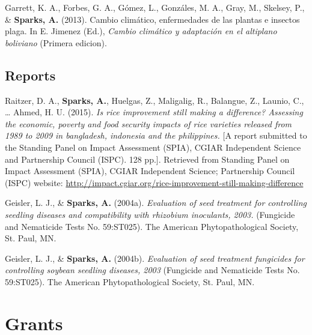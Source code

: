\documentclass[11pt, a4paper]{awesome-cv}
\begin{document}
\leavevmode\hypertarget{ref-Garrett2013}{}%
Garrett, K. A., Forbes, G. A., Gómez, L., Gonzáles, M. A., Gray, M.,
Skelsey, P., \& \textbf{Sparks, A.} (2013). Cambio climático,
enfermedades de las plantas e insectos plaga. In E. Jimenez (Ed.),
\emph{Cambio climático y adaptación en el altiplano boliviano} (Primera
edicion).

\endgroup

\hypertarget{reports}{%
\subsection{Reports}\label{reports}}

\begingroup
\setlength{\parindent}{-0.5in}
\setlength{\leftskip}{0.5in}

\hypertarget{refs_reports}{}
\leavevmode\hypertarget{ref-Raitzer2015}{}%
Raitzer, D. A., \textbf{Sparks, A.}, Huelgas, Z., Maligalig, R.,
Balangue, Z., Launio, C., \ldots{} Ahmed, H. U. (2015). \emph{Is rice
improvement still making a difference? Assessing the economic, poverty
and food security impacts of rice varieties released from 1989 to 2009
in bangladesh, indonesia and the philippines.} {[}A report submitted to
the Standing Panel on Impact Assessment (SPIA), CGIAR Independent
Science and Partnership Council (ISPC). 128 pp.{]}. Retrieved from
Standing Panel on Impact Assessment (SPIA), CGIAR Independent Science;
Partnership Council (ISPC) website:
\url{http://impact.cgiar.org/rice-improvement-still-making-difference}

\leavevmode\hypertarget{ref-Geisler2004}{}%
Geisler, L. J., \& \textbf{Sparks, A.} (2004a). \emph{Evaluation of seed
treatment for controlling seedling diseases and compatibility with
rhizobium inoculants, 2003.} (Fungicide and Nematicide Tests No.
59:ST025). The American Phytopathological Society, St. Paul, MN.

\leavevmode\hypertarget{ref-Geisler2004a}{}%
Geisler, L. J., \& \textbf{Sparks, A.} (2004b). \emph{Evaluation of seed
treatment fungicides for controlling soybean seedling diseases, 2003}
(Fungicide and Nematicide Tests No. 59:ST025). The American
Phytopathological Society, St. Paul, MN.

\endgroup

\hypertarget{grants}{%
\section{Grants}\label{grants}}
\end{document}
